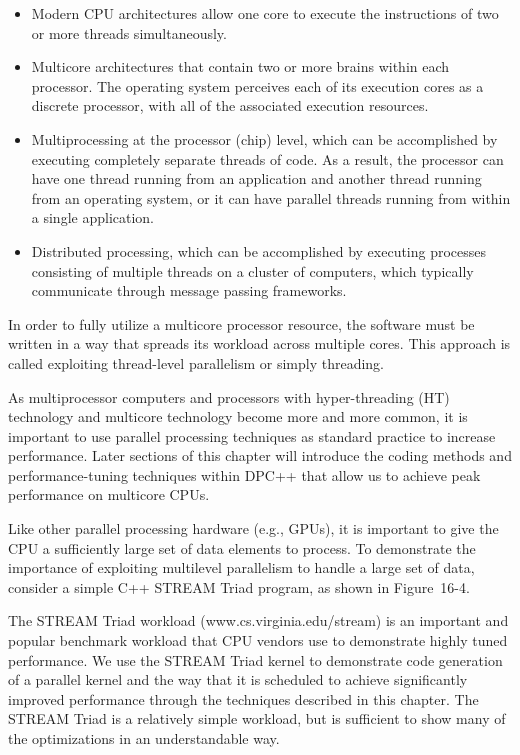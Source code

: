 \begin{itemize}
	\item Modern CPU architectures allow one core to execute the instructions of two or more threads simultaneously.
	\item Multicore architectures that contain two or more brains within each processor. The operating system perceives each of its execution cores as a discrete processor, with all of the associated execution resources.
	\item Multiprocessing at the processor (chip) level, which can be accomplished by executing completely separate threads of code. As a result, the processor can have one thread running from an application and another thread running from an operating system, or it can have parallel threads running from within a single application.
	\item Distributed processing, which can be accomplished by executing processes consisting of multiple threads on a cluster of computers, which typically communicate through message passing frameworks.
\end{itemize}

In order to fully utilize a multicore processor resource, the software must be written in a way that spreads its workload across multiple cores. This approach is called exploiting thread-level parallelism or simply threading.\par

As multiprocessor computers and processors with hyper-threading (HT) technology and multicore technology become more and more common, it is important to use parallel processing techniques as standard practice to increase performance. Later sections of this chapter will introduce the coding methods and performance-tuning techniques within DPC++ that allow us to achieve peak performance on multicore CPUs.\par

Like other parallel processing hardware (e.g., GPUs), it is important to give the CPU a sufficiently large set of data elements to process. To demonstrate the importance of exploiting multilevel parallelism to handle a large set of data, consider a simple C++ STREAM Triad program, as shown in Figure 16-4.\par

\begin{tcolorbox}[colback=blue!5!white,colframe=blue!75!black, title=A NOTE ABOUT STREAM TRIAD WORKLOAD]
The STREAM Triad workload (www.cs.virginia.edu/stream) is an important and popular benchmark workload that CPU vendors use to demonstrate highly tuned performance. We use the STREAM Triad kernel to demonstrate code generation of a parallel kernel and the way that it is scheduled to achieve significantly improved performance through the techniques described in this chapter. The STREAM Triad is a relatively simple workload, but is sufficient to show many of the optimizations in an understandable way.
\end{tcolorbox}

